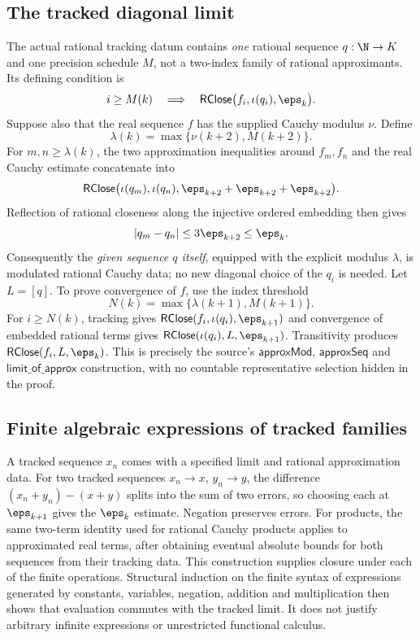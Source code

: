 \subsection{The tracked diagonal limit}\label{supp:13-2}
\par{}\par\smallskip

The actual rational tracking datum contains \emph{one} rational sequence $q:\N\to K$ and one precision schedule $M$, not a two-index family of rational approximants. Its defining condition is
\[
i\ge M(k)\quad\Longrightarrow\quad
\mathsf{RClose}\bigl(f_i,\iota(q_i),\eps_k\bigr).
\]
Suppose also that the real sequence $f$ has the supplied Cauchy modulus $\nu$. Define
\[
\lambda(k)=\max\{\nu(k+2),M(k+2)\}.
\]
For $m,n\ge\lambda(k)$, the two approximation inequalities around $f_m,f_n$ and the real Cauchy estimate concatenate into
\[
\mathsf{RClose}\bigl(\iota(q_m),\iota(q_n),
\eps_{k+2}+\eps_{k+2}+\eps_{k+2}\bigr).
\]
Reflection of rational closeness along the injective ordered embedding then gives
\[
|q_m-q_n|\le3\eps_{k+2}\le\eps_k.
\]
Consequently the \emph{given sequence $q$ itself}, equipped with the explicit modulus $\lambda$, is modulated rational Cauchy data; no new diagonal choice of the $q_i$ is needed. Let $L=[q]$. To prove convergence of $f$, use the index threshold
\[
N(k)=\max\{\lambda(k+1),M(k+1)\}.
\]
For $i\ge N(k)$, tracking gives $\mathsf{RClose}(f_i,\iota(q_i),\eps_{k+1})$ and convergence of embedded rational terms gives $\mathsf{RClose}(\iota(q_i),L,\eps_{k+1})$. Transitivity produces $\mathsf{RClose}(f_i,L,\eps_k)$. This is precisely the source's $\mathsf{approxMod}$, $\mathsf{approxSeq}$ and $\mathsf{limit\_of\_approx}$ construction, with no countable representative selection hidden in the proof.

\subsection{Finite algebraic expressions of tracked families}\label{supp:13-3}
\par{}\par\smallskip

A tracked sequence $x_n$ comes with a specified limit and rational approximation data. For two tracked sequences $x_n\to x$, $y_n\to y$, the difference $(x_n+y_n)-(x+y)$ splits into the sum of two errors, so choosing each at $\eps_{k+1}$ gives the $\eps_k$ estimate. Negation preserves errors. For products, the same two-term identity used for rational Cauchy products applies to approximated real terms, after obtaining eventual absolute bounds for both sequences from their tracking data. This construction supplies closure under each of the finite operations. Structural induction on the finite syntax of expressions generated by constants, variables, negation, addition and multiplication then shows that evaluation commutes with the tracked limit. It does not justify arbitrary infinite expressions or unrestricted functional calculus.

